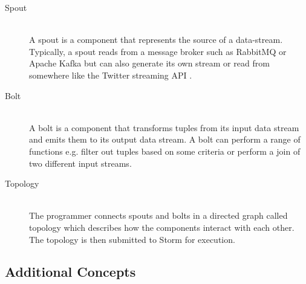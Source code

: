 \documentclass[bsc,logo,frontabs,twoside,singlespacing,normalheadings,parskip]{infthesis}\usepackage[]{graphicx}\usepackage[]{color}
\begin{document}
\begin{description}
  \item[Spout] \hfill \\
  A spout is a component that represents the source of a data-stream. Typically, a spout reads from a message broker such as RabbitMQ \cite{RabbitMQ} or Apache Kafka but can also generate its own stream or read from somewhere like the Twitter streaming API \citep{TwitterStreaming}.
  \item[Bolt] \hfill \\
  A bolt is a component that transforms tuples from its input data stream and emits them to its output data stream. A bolt can perform a range of functions e.g. filter out tuples based on some criteria or perform a join of two different input streams.
  \item[Topology] \hfill \\
  The programmer connects spouts and bolts in a directed graph called topology which describes how the components interact with each other. The topology is then submitted to Storm for execution.
\end{description}

\subsection{Additional Concepts}
\end{document}
